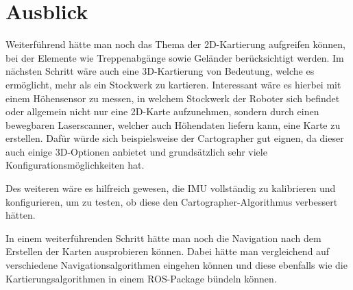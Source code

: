 \chapter{Ausblick} \label{Kap7}

Weiterführend hätte man noch das Thema der 2D-Kartierung aufgreifen können, bei der Elemente wie Treppenabgänge sowie Geländer berücksichtigt werden. Im nächsten Schritt wäre auch eine 3D-Kartierung von Bedeutung, welche es ermöglicht, mehr als ein Stockwerk zu kartieren. Interessant wäre es hierbei mit einem Höhensensor zu messen, in welchem Stockwerk der Roboter sich befindet oder allgemein nicht nur eine 2D-Karte aufzunehmen, sondern durch einen bewegbaren Laserscanner, welcher auch Höhendaten liefern kann, eine Karte zu erstellen. Dafür würde sich beispielsweise der Cartographer gut eignen, da dieser auch einige 3D-Optionen anbietet und grundsätzlich sehr viele Konfigurationsmöglichkeiten hat.

Des weiteren wäre es hilfreich gewesen, die \ac{IMU} vollständig zu kalibrieren und konfigurieren, um zu testen, ob diese den Cartographer-Algorithmus verbessert hätten.

In einem weiterführenden Schritt hätte man noch die Navigation nach dem Erstellen der Karten ausprobieren können. Dabei hätte man vergleichend auf verschiedene Navigationsalgorithmen eingehen können und diese ebenfalls wie die Kartierungsalgorithmen in einem \ac{ROS}-Package bündeln können.